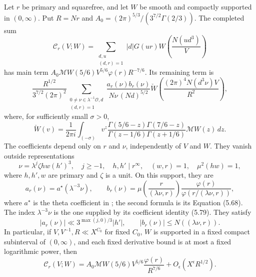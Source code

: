 \begin{theorem}
\label{thm:voronoi-background}
Let $r$ be primary and squarefree, and let $W$ be smooth and compactly
supported in $(0,\infty)$. Put $R=Nr$ and
$A_0=(2\pi)^{5/3}/(3^{7/2}\Gamma(2/3))$.
The completed sum
\[
 \mathcal C_r(V;W)=
 \sum_{\substack{d,u\\(d,r)=1}}|d|G(ur)
             W\left(\frac{N(ud^3)}{V}\right)
\]
has main term
$A_0\mathcal MW(5/6)V^{5/6}\varphi(r)R^{-7/6}$.
Its remaining term is
\[
 \frac{R^{1/2}}{3^{7/2}(2\pi)^2}
 \sum_{\substack{0\ne\nu\in\lambda^{-1}\mathcal O, d\\(d,r)=1}}
 \frac{a_r(\nu)b_r(\nu)}{N\nu\,(Nd)^{5/2}}
 \check W\left(\frac{(2\pi)^4N(d^3\nu)V}{R^2}\right),
\]
where, for sufficiently small $\sigma>0$,
\[
 \check W(v)=\frac{1}{2\pi i}\int_{(-\sigma)}v^z
 \frac{\Gamma(5/6-z)\Gamma(7/6-z)}
      {\Gamma(z-1/6)\Gamma(z+1/6)}\mathcal MW(z)\,dz.
\]
The coefficients depend only on $r$ and $\nu$, independently of $V$
and $W$. They vanish outside representations
\[
 \nu=\lambda^j\zeta h w(h')^3,\quad j\ge-1,\quad
 h,h'\mid r^\infty,\quad (w,r)=1,\quad \mu^2(hw)=1,
\]
where $h,h',w$ are primary and $\zeta$ is a unit.
On this support, they are
\[
 a_r(\nu)=a^\star(\lambda^{-3}\nu),\qquad
 b_r(\nu)=\mu\left(\frac{r}{(\lambda\nu,r)}\right)
          \frac{\varphi(r)}{\varphi\left(r/(\lambda\nu,r)\right)},
\]
where $a^\star$ is the theta coefficient in
\cite[Equation (5.74)]{DR2024}; the second formula is its
Equation (5.68). The index $\lambda^{-3}\nu$ is the one supplied
by its coefficient identity (5.79).
They satisfy
\[
 |a_r(\nu)|\ll 3^{\max(j,0)/3}|h'|,
 \qquad |b_r(\nu)|\le N((\lambda\nu,r)).
\]
In particular, if $V,V^{-1},R\ll X^{C_0}$ for fixed $C_0$, $W$ is
supported in a fixed compact subinterval of $(0,\infty)$, and each
fixed derivative bound is at most a fixed logarithmic power, then
\begin{equation}
 \mathcal C_r(V;W)=
 A_0\mathcal MW(5/6)V^{5/6}\frac{\varphi(r)}{R^{7/6}}
 +O_\epsilon(X^\epsilon R^{1/2}).
 \label{eq:voronoi}
\end{equation}
\end{theorem}


